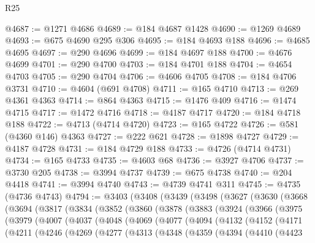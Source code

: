 \begin{lexlean}{R25}
\begin{coremodule}
@4687 := @1271 @4686
@4689 := @184 @4687 @1428
@4690 := @1269 @4689
@4693 := @675 @4690 @295 @306
@4695 := @184 @4693 @188
@4696 := @4685 @4695
@4697 := @290 @4696
@4699 := @184 @4697 @188
@4700 := @4676 @4699
@4701 := @290 @4700
@4703 := @184 @4701 @188
@4704 := @4654 @4703
@4705 := @290 @4704
@4706 := @4606 @4705
@4708 := @184 @4706 @3731
@4710 := @4604 (@691 @4708)
@4711 := @165 @4710
@4713 := @269 @4361 @4363
@4714 := @864 @4363
@4715 := @1476 @409
@4716 := @1474 @4715
@4717 := @1472 @4716
@4718 := @4187 @4717
@4720 := @184 @4718 @188
@4722 := @4713 (@4714 @4720)
@4723 := @165 @4722
@4726 := @581 (@4360 @146) @4363
@4727 := @222 @621
@4728 := @1898 @4727
@4729 := @4187 @4728
@4731 := @184 @4729 @188
@4733 := @4726 (@4714 @4731)
@4734 := @165 @4733
@4735 := @4603 @68
@4736 := @3927 @4706
@4737 := @3730 @205
@4738 := @3994 @4737
@4739 := @675 @4738
@4740 := @204 @4418
@4741 := @3994 @4740
@4743 := @4739 @4741 @311
@4745 := @4735 (@4736 @4743)
@4794 := @3403
    (@3408
      (@3439
        (@3498
          (@3627
            (@3630
              (@3668
                (@3694
                  (@3817
                    (@3834
                      (@3852
                        (@3860
                          (@3878
                            (@3883
                              (@3924
                                (@3966
                                  (@3975
                                    (@3979
                                      (@4007
                                        (@4037
                                          (@4048
                                            (@4069
                                              (@4077
                                                (@4094
                                                  (@4132
                                                    (@4152
                                                      (@4171
                                                        (@4211
                                                          (@4246
                                                            (@4269
                                                              (@4277
                                                                (@4313
                                                                  (@4348
                                                                    (@4359
                                                                      (@4394
                                                                        (@4410
                                                                          (@4423

\end{coremodule}
\end{lexlean}
